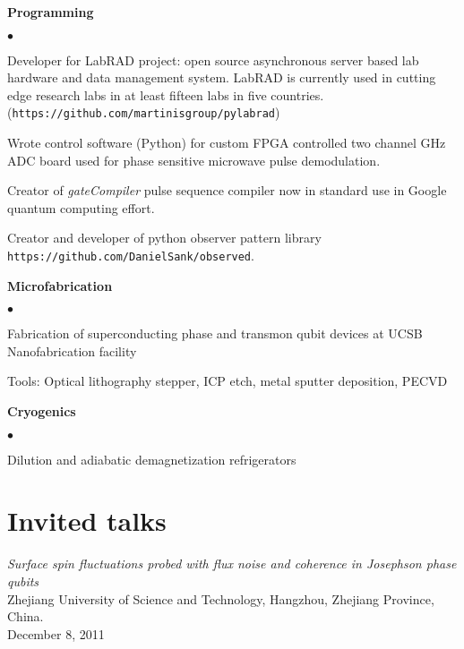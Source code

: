 \documentclass[margin=2cm,line]{res}
\newenvironment{list3}{
  \begin{list}{}{%
      \setlength{\itemsep}{0in}
      \setlength{\parsep}{0in} \setlength{\parskip}{0in}
      \setlength{\topsep}{0in} \setlength{\partopsep}{0in}
      \setlength{\leftmargin}{0.2in}}}{\end{list}}
\newenvironment{list4}{
  \begin{list}{$\bullet$}{%
      \setlength{\itemsep}{0in}
      \setlength{\parsep}{0in} \setlength{\parskip}{0in}
      \setlength{\topsep}{0in} \setlength{\partopsep}{0in}
      \setlength{\leftmargin}{0.2in}}}{\end{list}}
\begin{document}
\begin{resume}
{\bf Programming}\\
\vspace*{-.15in}
\begin{list4}
\item Developer for LabRAD project: open source asynchronous server based lab hardware and data management system. LabRAD is currently used in cutting edge research labs in at least fifteen labs in five countries.\\
(\texttt{https://github.com/martinisgroup/pylabrad})
\item Wrote control software (Python) for custom FPGA controlled two channel GHz ADC board used for phase sensitive microwave pulse demodulation.
\item Creator of \emph{gateCompiler} pulse sequence compiler now in standard use in Google quantum computing effort.
\item Creator and developer of python observer pattern library \\
\quad \texttt{https://github.com/DanielSank/observed}.
\end{list4}

{\bf Microfabrication}\\
\vspace*{-.15in}
\begin{list4}
\item Fabrication of superconducting phase and transmon qubit devices at UCSB Nanofabrication facility
\item Tools: Optical lithography stepper, ICP etch, metal sputter deposition, PECVD
\end{list4}

{\bf Cryogenics}\\
\vspace*{-.15in}
\begin{list4}
\item Dilution and adiabatic demagnetization refrigerators
\end{list4}

\section{\sc Invited talks}
\begin{list3}
\item \textit{Surface spin fluctuations probed with flux noise and coherence in Josephson phase qubits}\\
Zhejiang University of Science and Technology, Hangzhou, Zhejiang Province, China.\\ December 8, 2011
\end{list3}


\end{resume}
\end{document}
